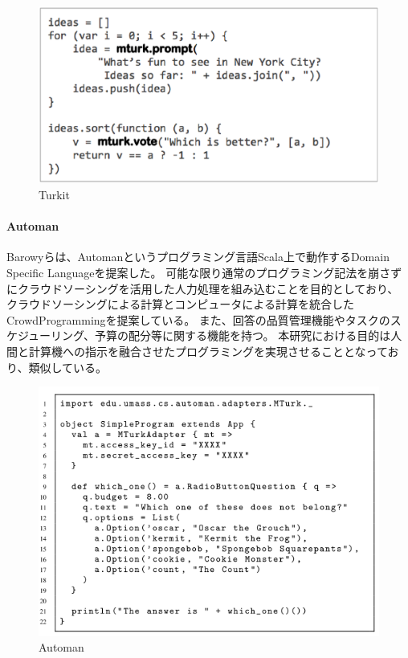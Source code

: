\begin{figure}[htbp]
  \begin{center}
  \includegraphics[width=.6\linewidth]{images/turkit.eps}
  \end{center}
  \caption{Turkit}
  \label{fig:turkit}
\end{figure}

\paragraph{Automan}\label{automan}

\mbox{}

Barowyらは、Automan\cite{automan}というプログラミング言語Scala上で動作するDomain
Specific Languageを提案した。
可能な限り通常のプログラミング記法を崩さずにクラウドソーシングを活用した人力処理を組み込むことを目的としており、
クラウドソーシングによる計算とコンピュータによる計算を統合したCrowdProgrammingを提案している。
また、回答の品質管理機能やタスクのスケジューリング、予算の配分等に関する機能を持つ。
本研究における目的は人間と計算機への指示を融合させたプログラミングを実現させることとなっており、類似している。

\begin{figure}[htbp]
  \begin{center}
  \includegraphics[width=.6\linewidth,bb=0 0 552 404]{images/automan.png}
  \end{center}
  \caption{Automan}
  \label{fig:automan}
\end{figure}

